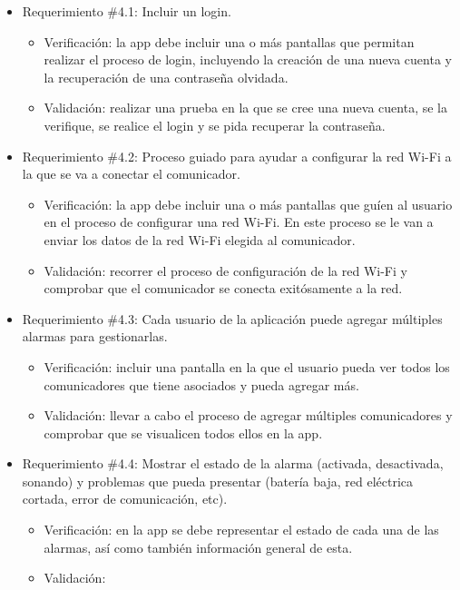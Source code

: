 \documentclass[
11pt, %
codirector, %
]{charter}
\begin{document}
\begin{itemize}
	\item Requerimiento \#4.1: Incluir un login.
	\begin{itemize}
		\item Verificación: la app debe incluir una o más pantallas que permitan realizar el proceso de login, incluyendo la creación de una nueva cuenta y la recuperación de una contraseña olvidada.
		\item Validación: realizar una prueba en la que se cree una nueva cuenta, se la verifique, se realice el login y se pida recuperar la contraseña.
	\end{itemize}
			
	\item Requerimiento \#4.2: Proceso guiado para ayudar a configurar la red Wi-Fi a la que se va a conectar el comunicador.
	\begin{itemize}
		\item Verificación: la app debe incluir una o más pantallas que guíen al usuario en el proceso de configurar una red Wi-Fi. En este proceso se le van a enviar los datos de la red Wi-Fi elegida al comunicador.
		\item Validación: recorrer el proceso de configuración de la red Wi-Fi y comprobar que el comunicador se conecta exitósamente a la red.
	\end{itemize}
			
	\item Requerimiento \#4.3: Cada usuario de la aplicación puede agregar múltiples alarmas para gestionarlas.
	\begin{itemize}
		\item Verificación: incluir una pantalla en la que el usuario pueda ver todos los comunicadores que tiene asociados y pueda agregar más.
		\item Validación: llevar a cabo el proceso de agregar múltiples comunicadores y comprobar que se visualicen todos ellos en la app.
	\end{itemize}
			
	\item Requerimiento \#4.4: Mostrar el estado de la alarma (activada, desactivada, sonando) y problemas que pueda presentar (batería baja, red eléctrica cortada, error de comunicación, etc).
	\begin{itemize}
		\item Verificación: en la app se debe representar el estado de cada una de las alarmas, así como también información general de esta.
		\item Validación:
	\end{itemize}
			

\end{itemize}
\end{document}
